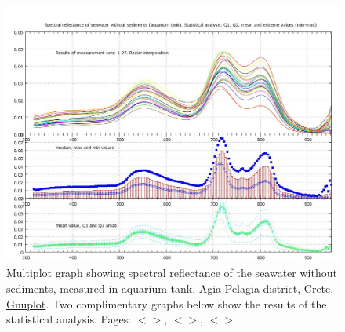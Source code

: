 \documentclass[11pt]{article}
\begin{document}
\begin{appendices}
\begin{figure}[H]
	\centering
	\includegraphics[scale=0.30]{GNU-21.jpg}
	\caption{Multiplot graph showing spectral reflectance of the seawater without sediments, measured in aquarium tank, Agia Pelagia district, Crete. \href{http://www.gnuplot.info/}{Gnuplot}. Two complimentary graphs below show the results of the statistical analysis. Pages: $<$\pageref{page-28}$>$, $<$\pageref{dataprep}$>$, $<$\pageref{page-35}$>$}
	\label{fig:27}
\end{figure}


\end{appendices}
\end{document}
